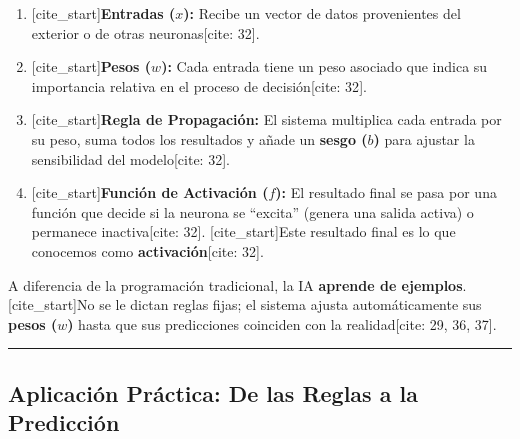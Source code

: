 \documentclass[
  spanish,
  letterpaper,
  DIV=11,
  numbers=noendperiod,
  oneside]{scrreprt}
\providecommand{\tightlist}{%
  \setlength{\itemsep}{0pt}\setlength{\parskip}{0pt}}
\begin{document}
\begin{enumerate}
\def\labelenumi{\arabic{enumi}.}
\tightlist
\item
  {[}cite\_start{]}\textbf{Entradas (\(x\)):} Recibe un vector de datos
  provenientes del exterior o de otras neuronas{[}cite: 32{]}.
\item
  {[}cite\_start{]}\textbf{Pesos (\(w\)):} Cada entrada tiene un peso
  asociado que indica su importancia relativa en el proceso de
  decisión{[}cite: 32{]}.
\item
  {[}cite\_start{]}\textbf{Regla de Propagación:} El sistema multiplica
  cada entrada por su peso, suma todos los resultados y añade un
  \textbf{sesgo (\(b\))} para ajustar la sensibilidad del modelo{[}cite:
  32{]}.
\item
  {[}cite\_start{]}\textbf{Función de Activación (\(f\)):} El resultado
  final se pasa por una función que decide si la neurona se ``excita''
  (genera una salida activa) o permanece inactiva{[}cite: 32{]}.
  {[}cite\_start{]}Este resultado final es lo que conocemos como
  \textbf{activación}{[}cite: 32{]}.
\end{enumerate}

\begin{tcolorbox}[enhanced jigsaw, arc=.35mm, bottomrule=.15mm, bottomtitle=1mm, breakable, colback=white, colbacktitle=quarto-callout-important-color!10!white, colframe=quarto-callout-important-color-frame, coltitle=black, left=2mm, leftrule=.75mm, opacityback=0, opacitybacktitle=0.6, rightrule=.15mm, title=\textcolor{quarto-callout-important-color}{\faExclamation}\hspace{0.5em}{Concepto Clave: Aprendizaje vs.~Reglas}, titlerule=0mm, toprule=.15mm, toptitle=1mm]

A diferencia de la programación tradicional, la IA \textbf{aprende de
ejemplos}. {[}cite\_start{]}No se le dictan reglas fijas; el sistema
ajusta automáticamente sus \textbf{pesos (\(w\))} hasta que sus
predicciones coinciden con la realidad{[}cite: 29, 36, 37{]}.

\end{tcolorbox}

\begin{center}\rule{0.5\linewidth}{0.5pt}\end{center}

\subsection{Aplicación Práctica: De las Reglas a la
Predicción}\label{aplicaciuxf3n-pruxe1ctica-de-las-reglas-a-la-predicciuxf3n}
\end{document}
